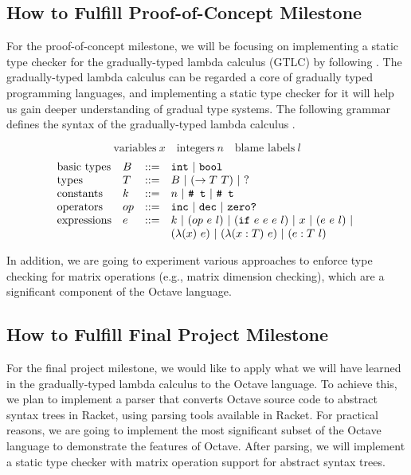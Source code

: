 \subsection{How to Fulfill Proof-of-Concept Milestone}
For the proof-of-concept milestone, we will be focusing on implementing a static
type checker for the gradually-typed lambda calculus (GTLC) by following
\cite{siek2012interpretations}. The gradually-typed lambda calculus can be
regarded a core of gradually typed programming languages, and implementing a
static type checker for it will help us gain deeper understanding of gradual
type systems. The following grammar defines the syntax of the gradually-typed
lambda calculus \cite{siek2012interpretations}.

$$ \text{variables} \ x \quad \text{integers} \ n \quad \text{blame labels} \ l $$
$$
\begin{array}{llll}
    \text{basic types} & B & ::= & \text{\tt int} \ | \ \text{\tt bool} \\
    \text{types} & T & ::= & B \ | \ (\rightarrow T \ T) \ | \ \text{?} \\
    \text{constants} & k & ::= & n \ | \ \text{\tt \# t} \ | \ \text{\tt \# t} \\
    \text{operators} & op & ::= & \text{\tt inc} \ | \ \text{\tt dec} \ | \ \text{\tt zero?} \\
    \text{expressions} & e & ::= & k \ | \ (op \ e \ l) \ | \ (\text{\tt if} \ e \ e \ e \ l) \ | \ x \ | \ (e \ e \ l) \ | \ \\
    & & & (\lambda (x) \ e) \ | \ (\lambda (x : T) \ e) \ | \ (e : T \ l)
\end{array}
$$

In addition, we are going to experiment various approaches to enforce type
checking for matrix operations (e.g., matrix dimension checking), which are a
significant component of the Octave language.

\subsection{How to Fulfill Final Project Milestone}
For the final project milestone, we would like to apply what we will have
learned in the gradually-typed lambda calculus to the Octave language. To
achieve this, we plan to implement a parser that converts Octave source code to
abstract syntax trees in Racket, using parsing tools available in Racket.
For practical reasons, we are going to implement the most significant subset of
the Octave language to demonstrate the features of Octave. After parsing, we
will implement a static type checker with matrix operation support for abstract
syntax trees.

